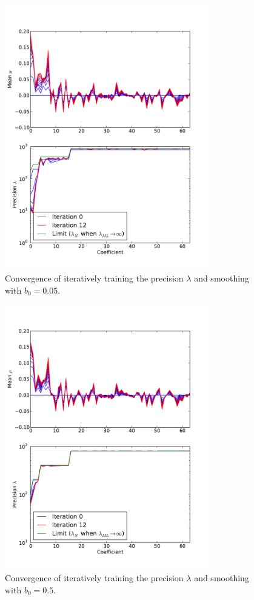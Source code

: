 \documentclass{article}
\begin{document}
\begin{figure}
    \centering
    \includegraphics[width=0.8\textwidth]{figs/p3.pdf}
    \caption{Convergence of iteratively training the precision $\lambda$ and smoothing with $b_0 = 0.05$.} \label{fig:iter3}
\end{figure}

\begin{figure}
    \centering
    \includegraphics[width=0.8\textwidth]{figs/p4.pdf}
    \caption{Convergence of iteratively training the precision $\lambda$ and smoothing with $b_0 = 0.5$.} \label{fig:iter4}
\end{figure}
\end{document}
